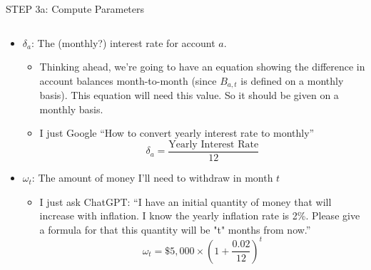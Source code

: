 \documentclass[10pt, aspectratio=169]{beamer}
\begin{document}
\begin{frame}{STEP 3a: Compute Parameters}
    \begin{columns}
        \begin{column}{\textwidth}
            \begin{itemize}
                \item $\delta_a$: The (monthly?) interest rate for account $a$.
                \begin{itemize}
                    \item Thinking ahead, we're going to have an equation showing the difference in account balances month-to-month (since $B_{a,t}$ is defined on a monthly basis). This equation will need this value. So it should be given on a monthly basis.
                    \item I just Google \enquote{How to convert yearly interest rate to monthly}
                    $$\delta_a = \frac{\text{Yearly Interest Rate}}{12}$$
                \end{itemize}
                \item $\omega_t$: The amount of money I'll need to withdraw in month $t$
                \begin{itemize}
                    \item I just ask ChatGPT: \enquote{I have an initial quantity of money that will increase with inflation. I know the yearly inflation rate is 2\%. Please give a formula for that this quantity will be "t" months from now.}
                    $$\omega_t = \$5,000 \times (1 + \frac{0.02}{12})^t$$
                \end{itemize}
            \end{itemize}
        \end{column}
    \end{columns}
\end{frame}
\end{document}
